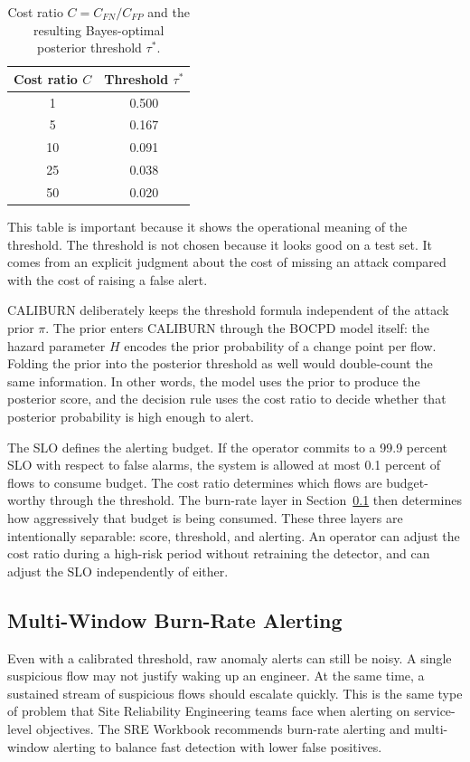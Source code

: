 \documentclass[preprint,12pt,authoryear]{elsarticle}
\newcommand{\caliburn}{CALIBURN}
\begin{document}
\begin{table}[ht]
\centering
\caption{Cost ratio $C = C_{FN}/C_{FP}$ and the resulting Bayes-optimal posterior threshold $\tau^{*}$.}
\label{tab:cost-thresholds}
\begin{tabular}{cc}
\toprule
Cost ratio $C$ & Threshold $\tau^{*}$ \\
\midrule
1   & 0.500 \\
5   & 0.167 \\
10  & 0.091 \\
25  & 0.038 \\
50  & 0.020 \\
\bottomrule
\end{tabular}
\end{table}

This table is important because it shows the operational meaning of the threshold. The threshold is not chosen because it looks good on a test set. It comes from an explicit judgment about the cost of missing an attack compared with the cost of raising a false alert.

\caliburn{} deliberately keeps the threshold formula independent of the attack prior $\pi$. The prior enters \caliburn{} through the BOCPD model itself: the hazard parameter $H$ encodes the prior probability of a change point per flow. Folding the prior into the posterior threshold as well would double-count the same information. In other words, the model uses the prior to produce the posterior score, and the decision rule uses the cost ratio to decide whether that posterior probability is high enough to alert.

The SLO defines the alerting budget. If the operator commits to a 99.9 percent SLO with respect to false alarms, the system is allowed at most 0.1 percent of flows to consume budget. The cost ratio determines which flows are budget-worthy through the threshold. The burn-rate layer in Section~\ref{sec:method-burnrate} then determines how aggressively that budget is being consumed. These three layers are intentionally separable: score, threshold, and alerting. An operator can adjust the cost ratio during a high-risk period without retraining the detector, and can adjust the SLO independently of either.

\subsection{Multi-Window Burn-Rate Alerting}
\label{sec:method-burnrate}

Even with a calibrated threshold, raw anomaly alerts can still be noisy. A single suspicious flow may not justify waking up an engineer. At the same time, a sustained stream of suspicious flows should escalate quickly. This is the same type of problem that Site Reliability Engineering teams face when alerting on service-level objectives. The SRE Workbook \citep{beyer2018workbook} recommends burn-rate alerting and multi-window alerting to balance fast detection with lower false positives.
\end{document}
